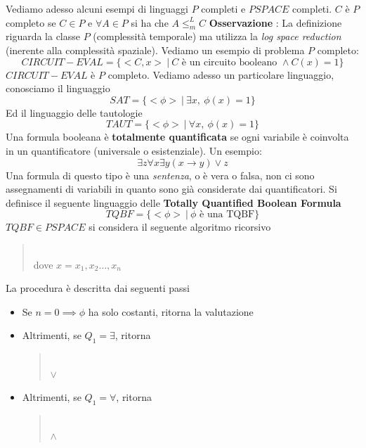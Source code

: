 \documentclass[10pt, letterpaper]{report}
\begin{document}
Vediamo adesso alcuni esempi di linguaggi $P$ completi e $PSPACE$ completi.\acc 
{} $C$ è $P$ completo se $C\in P$ e $\forall A\in P$ si ha che $A\le_m^L C$\acc 
\textbf{Osservazione} : La definizione riguarda la classe $P$ (complessità temporale) ma utilizza la \textit{log space reduction} (inerente alla complessità spaziale).
Vediamo un esempio di problema $P$ completo: 
$$ CIRCUIT-EVAL=\{<C,x> \ | \ C\text{ è un circuito booleano }\land C(x)=1\}$$
\teo{} $CIRCUIT-EVAL$ è $P$ completo.\acc 
Vediamo adesso un particolare linguaggio, conosciamo il linguaggio $$ SAT=\{<\phi>\ | \ \exists x,\ \phi(x)=1 \}$$
Ed il linguaggio delle tautologie 
$$ TAUT=\{<\phi> \ | \ \forall x, \ \phi(x)=1\}$$
 Una formula booleana è \textbf{totalmente quantificata} se ogni variabile è coinvolta in un quantificatore (universale o esistenziale). Un esempio:$$\exists z \forall x \exists y (x\rightarrow y) \lor z $$
Una formula di questo tipo è una \textit{sentenza}, o è vera o falsa, non ci sono assegnamenti di variabili in quanto sono già considerate dai quantificatori.
Si definisce il seguente linguaggio delle \textbf{Totally Quantified Boolean Formula}
$$ TQBF=\{<\phi> \ | \ \phi \text{ è una TQBF} \}$$
\teo{} $TQBF\in PSPACE$\acc 
\dimo{} si considera il seguente algoritmo ricorsivo \begin{quote}
     \\ 
    dove $x=x_1,x_2\dots ,x_n$
\end{quote}
La procedura è descritta dai seguenti passi \begin{itemize}
    \item Se $n=0\implies \phi$ ha solo costanti, ritorna la valutazione 
    \item Altrimenti, se $Q_1=\exists$, ritorna \begin{quote}
\\ $\lor$\\
    \end{quote}
    \item Altrimenti, se $Q_1=\forall$, ritorna \begin{quote}
\\ $\land$\\
    \end{quote}
\end{itemize}
\end{document}
